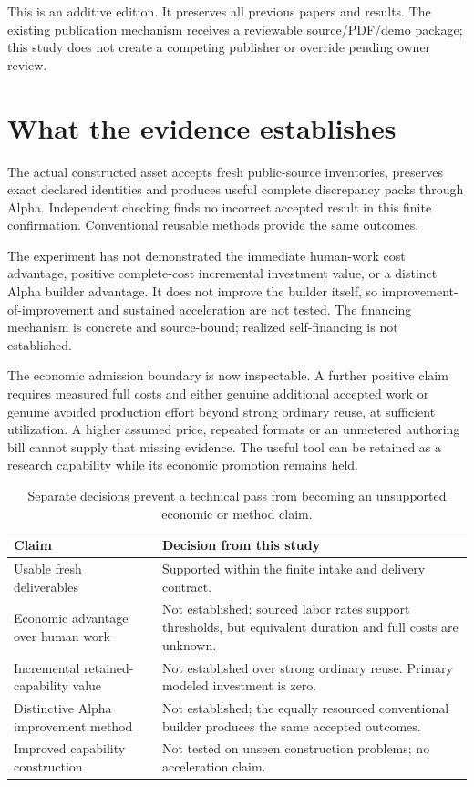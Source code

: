 \documentclass[11pt,a4paper]{article}
\begin{document}
This is an additive edition. It preserves all previous papers and results. The
existing publication mechanism receives a reviewable source/PDF/demo package;
this study does not create a competing publisher or override pending owner review.

\section{What the evidence establishes}
The actual constructed asset accepts fresh public-source inventories, preserves
exact declared identities and produces useful complete discrepancy packs through
Alpha. Independent checking finds no incorrect accepted result in this finite
confirmation. Conventional reusable methods provide the same outcomes.

The experiment has not demonstrated the immediate human-work cost advantage,
positive complete-cost incremental investment value, or a distinct Alpha builder
advantage. It does not improve the builder itself, so improvement-of-improvement
and sustained acceleration are not tested. The financing mechanism is concrete
and source-bound; realized self-financing is not established.

The economic admission boundary is now inspectable. A further positive claim
requires measured full costs and either genuine additional accepted work or
genuine avoided production effort beyond strong ordinary reuse, at sufficient
utilization. A higher assumed price, repeated formats or an unmetered authoring
bill cannot supply that missing evidence. The useful tool can be retained as a
research capability while its economic promotion remains held.

\begin{table}[ht]\small\centering
\begin{tabularx}{\linewidth}{@{}>{\raggedright\arraybackslash}p{.35\linewidth}X@{}}\toprule
Claim & Decision from this study\\\midrule
Usable fresh deliverables & Supported within the finite intake and delivery contract.\\
Economic advantage over human work & Not established; sourced labor rates support thresholds, but equivalent duration and full costs are unknown.\\
Incremental retained-capability value & Not established over strong ordinary reuse. Primary modeled investment is zero.\\
Distinctive Alpha improvement method & Not established; the equally resourced conventional builder produces the same accepted outcomes.\\
Improved capability construction & Not tested on unseen construction problems; no acceleration claim.\\\bottomrule
\end{tabularx}
\caption{Separate decisions prevent a technical pass from becoming an unsupported economic or method claim.}
\end{table}
\end{document}
